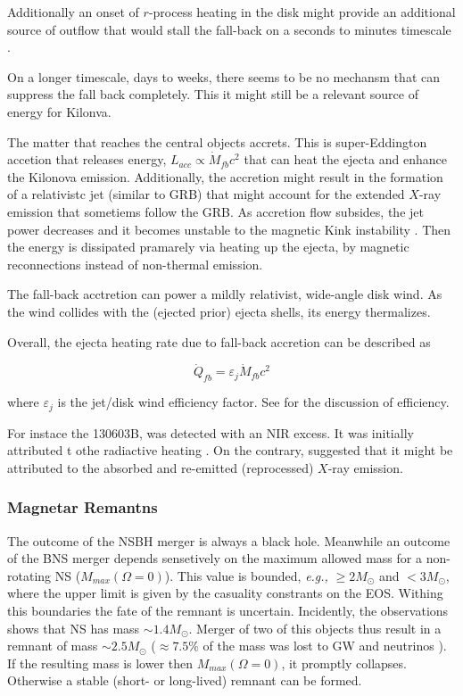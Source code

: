 \documentclass[11pt,a4paper,headinclude=true,DIV=14,BCOR=8mm,chapterprefix,listof=totoc,twoside,openright,abstracton]{scrbook}
\begin{document}
Additionally an onset of $r$-process heating in the disk might provide an additional source of outflow that would stall the fall-back on a seconds to minutes timescale \cite{Metzger et al 2010a)}.

On a longer timescale, days to weeks, there seems to be no mechansm that can suppress the fall back completely. This it might still be a relevant source of energy for Kilonva.

The matter that reaches the central objects accrets. This is super-Eddington accetion that releases energy, $L_{acc} \propto \dot{M}_{fb} c^2$ that can heat the ejecta and enhance  the Kilonova emission. Additionally, the accretion might result in the formation of a relativistc jet (similar to GRB) that might account for the extended $X$-ray emission that sometiems follow the GRB.
As accretion flow subsides, the jet power decreases and it becomes unstable to the magnetic Kink instability \cite{(Bromberg and Tchekhovskoy 2016)}. Then the energy is dissipated pramarely via heating up the ejecta, by magnetic reconnections instead of non-thermal emission. 

The fall-back acctretion can power a mildly relativist, wide-angle disk wind. As the wind collides with the (ejected prior) ejecta shells, its energy thermalizes. 

Overall, the ejecta heating rate due to fall-back accretion can be described as 

\begin{equation}
    \dot{Q}_{fb} = \varepsilon_{j}\dot{M}_{fb}c^2
\end{equation}

where $\varepsilon_{j}$ is the jet/disk wind efficiency factor. See \cite{Tchekhovskoy et al 2011). Kisaka and Ioka (2015)} for the discussion of efficiency.

For instace the 130603B, was detected with an NIR excess. It was initially attributed t othe radiactive heating \cite{Tanvir et al (2013)} \cite{Berger et al (2013)}. On the contrary, \cite{Kisaka et al (2016)} suggested that it might be attributed to the absorbed and re-emitted (reprocessed) $X$-ray emission. 


\subsubsection{Magnetar Remantns}

The outcome of the NSBH merger is always a black hole. Meanwhile an outcome of the BNS merger depends sensetively on the maximum allowed mass for a non-rotating NS ($M_{max}(\Omega=0)$). 
This value is bounded, \textit{e.g.,} $\geq 2M_{\odot}$ \cite{(Demorest et al 2010; Antoniadis et al 2013)} and $< 3M_{\odot}$, where the upper limit is given by the casuality constrants on the EOS. 
Withing this boundaries the fate of the remnant is uncertain. Incidently, the observations shows that NS has mass $\sim 1.4M_{\odot}$. Merger of two of this objects thus result in a remnant of mass $\sim2.5M_{\odot}$ ($\approx7.5\%$ of the mass was lost to GW and neutrinos \cite{(Timmes et al 1996)}). If the resulting mass is lower then $M_{max}(\Omega=0)$, it promptly collapses. Otherwise a stable (short- or long-lived) remnant can be formed.
\end{document}

